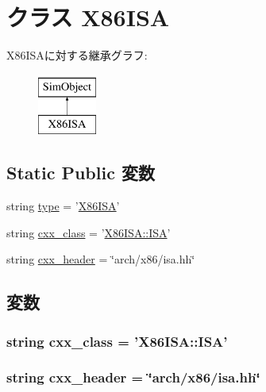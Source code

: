\hypertarget{classX86ISA_1_1X86ISA}{
\section{クラス X86ISA}
\label{classX86ISA_1_1X86ISA}
}
X86ISAに対する継承グラフ:\begin{figure}[H]
\begin{center}
\leavevmode
\includegraphics[height=2cm]{classX86ISA_1_1X86ISA}
\end{center}
\end{figure}
\subsection*{Static Public 変数}
\begin{DoxyCompactItemize}
\item 
string \hyperlink{classX86ISA_1_1X86ISA_acce15679d830831b0bbe8ebc2a60b2ca}{type} = '\hyperlink{classX86ISA_1_1X86ISA}{X86ISA}'
\item 
string \hyperlink{classX86ISA_1_1X86ISA_a58cd55cd4023648e138237cfc0822ae3}{cxx\_\-class} = '\hyperlink{classX86ISA_1_1ISA}{X86ISA::ISA}'
\item 
string \hyperlink{classX86ISA_1_1X86ISA_a17da7064bc5c518791f0c891eff05fda}{cxx\_\-header} = \char`\"{}arch/x86/isa.hh\char`\"{}
\end{DoxyCompactItemize}


\subsection{変数}
\hypertarget{classX86ISA_1_1X86ISA_a58cd55cd4023648e138237cfc0822ae3}{
\subsubsection[{cxx\_\-class}]{\setlength{\rightskip}{0pt plus 5cm}string {\bf cxx\_\-class} = '{\bf X86ISA::ISA}'}}
\label{classX86ISA_1_1X86ISA_a58cd55cd4023648e138237cfc0822ae3}
\hypertarget{classX86ISA_1_1X86ISA_a17da7064bc5c518791f0c891eff05fda}{
\subsubsection[{cxx\_\-header}]{\setlength{\rightskip}{0pt plus 5cm}string {\bf cxx\_\-header} = \char`\"{}arch/x86/isa.hh\char`\"{}}}
\label{classX86ISA_1_1X86ISA_a17da7064bc5c518791f0c891eff05fda}


